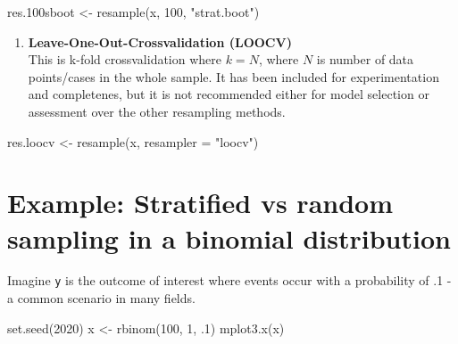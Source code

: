 \documentclass[
]{book}
\newenvironment{Shaded}{\begin{snugshade}}{\end{snugshade}}
\newcommand{\AttributeTok}[1]{\textcolor[rgb]{0.77,0.63,0.00}{#1}}
\newcommand{\DecValTok}[1]{\textcolor[rgb]{0.00,0.00,0.81}{#1}}
\newcommand{\FloatTok}[1]{\textcolor[rgb]{0.00,0.00,0.81}{#1}}
\newcommand{\FunctionTok}[1]{\textcolor[rgb]{0.00,0.00,0.00}{#1}}
\newcommand{\NormalTok}[1]{#1}
\newcommand{\OtherTok}[1]{\textcolor[rgb]{0.56,0.35,0.01}{#1}}
\newcommand{\StringTok}[1]{\textcolor[rgb]{0.31,0.60,0.02}{#1}}
\providecommand{\tightlist}{%
  \setlength{\itemsep}{0pt}\setlength{\parskip}{0pt}}
\begin{document}
\begin{Shaded}
\begin{Highlighting}[]
\NormalTok{res}\FloatTok{.100}\NormalTok{sboot }\OtherTok{\textless{}{-}} \FunctionTok{resample}\NormalTok{(x, }\DecValTok{100}\NormalTok{, }\StringTok{"strat.boot"}\NormalTok{)}
\end{Highlighting}
\end{Shaded}

\begin{enumerate}
\def\labelenumi{\arabic{enumi}.}
\setcounter{enumi}{4}
\tightlist
\item
  \textbf{Leave-One-Out-Crossvalidation (LOOCV)}\\
  This is k-fold crossvalidation where \(k = N\), where \(N\) is number of data points/cases in the whole sample. It has been included for experimentation and completenes, but it is not recommended either for model selection or assessment over the other resampling methods.
\end{enumerate}

\begin{Shaded}
\begin{Highlighting}[]
\NormalTok{res.loocv }\OtherTok{\textless{}{-}} \FunctionTok{resample}\NormalTok{(x, }\AttributeTok{resampler =} \StringTok{"loocv"}\NormalTok{)}
\end{Highlighting}
\end{Shaded}

\hypertarget{example-stratified-vs-random-sampling-in-a-binomial-distribution}{%
\section{Example: Stratified vs random sampling in a binomial distribution}\label{example-stratified-vs-random-sampling-in-a-binomial-distribution}}

Imagine \texttt{y} is the outcome of interest where events occur with a probability of .1 - a common scenario in many fields.

\begin{Shaded}
\begin{Highlighting}[]
\FunctionTok{set.seed}\NormalTok{(}\DecValTok{2020}\NormalTok{)}
\NormalTok{x }\OtherTok{\textless{}{-}} \FunctionTok{rbinom}\NormalTok{(}\DecValTok{100}\NormalTok{, }\DecValTok{1}\NormalTok{, .}\DecValTok{1}\NormalTok{)}
\FunctionTok{mplot3.x}\NormalTok{(x)}
\end{Highlighting}
\end{Shaded}
\end{document}

